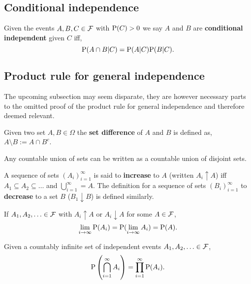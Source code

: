 \subsection{Conditional independence}

\begingroup\belowdisplayskip=-20pt
\begin{definition}
    Given the events $A,B,C \in \FFF$ with $\P(C)>0$ we say $A$ and $B$ are \textbf{conditional independent} given $C$ iff, \[
        \P(A\cap B|C) = \P(A|C)\P(B|C) \textcolor{black}{.}
    \]
\end{definition}
\endgroup

\subsection{Product rule for general independence}
The upcoming subsection may seem disparate, they are however necessary parts to the omitted proof of the product rule for general independence and therefore deemed relevant.
\begin{definition}
        Given two set $A,B\in\Omega$ the \textbf{set difference} of $A$ and $B$ is defined as, $A\setminus B := A \cap B^c$.
\end{definition}

\begin{lemma}
    Any countable union of sets can be written as a countable union of disjoint sets.
\end{lemma}

\begin{definition}
    A sequence of sets $(A_i)_{i=1}^\infty$ is said to \textbf{increase} to $A$ (written $A_i \uparrow A$) iff $A_1 \subseteq A_2 \subseteq \ldots$ and $\bigcup\limits_{i=1}^\infty = A$. The definition for a sequence of sets $(B_i)_{i=1}^\infty$ to \textbf{decrease} to a set $B$ ($B_1 \downarrow B$) is defined similarly.
\end{definition}

\begingroup\belowdisplayskip=-10pt
\begin{theorem}
    If $A_1, A_2, \ldots \in \FFF$ with $A_i \uparrow A$ or $A_i \downarrow A$ for some $A \in \FFF$, \[
        \lim_{i\rightarrow\infty}\P(A_i) = \P(\lim_{i\rightarrow\infty}A_i) = \P(A)
    \textcolor{black}{.}\]
\end{theorem}
\endgroup

\begingroup\belowdisplayskip=-20pt\abovedisplayskip=-10pt
\begin{theorem}
    Given a countably infinite set of independent events $A_1, A_2, \ldots \in \FFF$, \[
     \P\left(\bigcap_{i=1}^\infty{A_i}\right) = \prod_{i=1}^\infty\P(A_i)\textcolor{black}{.}
    \]
\end{theorem}
\endgroup

